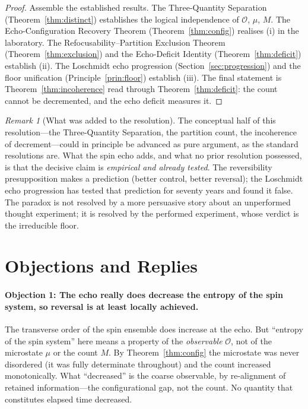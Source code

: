 \documentclass[11pt,a4paper]{article}
\theoremstyle{thmstyle}
\theoremstyle{definition}
\theoremstyle{remark}
\newtheorem{remark}[theorem]{Remark}
\newcommand{\Obs}{\mathcal{O}}
\newcommand{\Mic}{\mu}
\newcommand{\Count}{M}
\begin{document}
\begin{proof}
Assemble the established results. The Three-Quantity Separation
(Theorem~\ref{thm:distinct}) establishes the logical independence of
$\Obs$, $\Mic$, $\Count$. The Echo-Configuration Recovery Theorem
(Theorem~\ref{thm:config}) realises (i) in the laboratory. The
Refocusability--Partition Exclusion Theorem (Theorem~\ref{thm:exclusion})
and the Echo-Deficit Identity (Theorem~\ref{thm:deficit}) establish (ii).
The Loschmidt echo progression (Section~\ref{sec:progression}) and the
floor unification (Principle~\ref{prin:floor}) establish (iii). The final
statement is Theorem~\ref{thm:incoherence} read through
Theorem~\ref{thm:deficit}: the count cannot be decremented, and the echo
deficit measures it.
\end{proof}

\begin{remark}[What was added to the resolution]
\label{rem:what-added}
The conceptual half of this resolution---the Three-Quantity Separation,
the partition count, the incoherence of decrement---could in principle
be advanced as pure argument, as the standard resolutions are. What the
spin echo adds, and what no prior resolution possessed, is that the
decisive claim is \emph{empirical and already tested}. The reversibility
presupposition makes a prediction (better control, better reversal); the
Loschmidt echo progression has tested that prediction for seventy years
and found it false. The paradox is not resolved by a more persuasive
story about an unperformed thought experiment; it is resolved by the
performed experiment, whose verdict is the irreducible floor.
\end{remark}

\section{Objections and Replies}
\label{sec:objections}

\paragraph{Objection 1: The echo really does decrease the entropy of the
spin system, so reversal is at least locally achieved.} The transverse
order of the spin ensemble does increase at the echo. But ``entropy of
the spin system'' here means a property of the \emph{observable} $\Obs$,
not of the microstate $\Mic$ or the count $\Count$. By
Theorem~\ref{thm:config} the microstate was never disordered (it was
fully determinate throughout) and the count increased monotonically. What
``decreased'' is the coarse observable, by re-alignment of retained
information---the configurational gap, not the count. No quantity that
constitutes elapsed time decreased.
\end{document}
